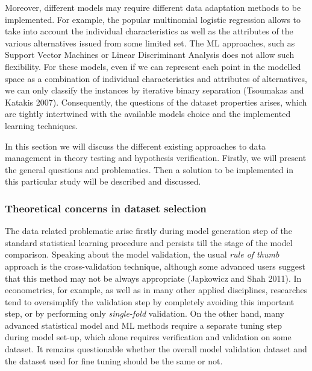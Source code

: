 \documentclass[12pt,]{article}
\begin{document}
Moreover, different models may require different data adaptation methods
to be implemented. For example, the popular multinomial logistic
regression allows to take into account the individual characteristics as
well as the attributes of the various alternatives issued from some
limited set. The ML approaches, such as Support Vector Machines or
Linear Discriminant Analysis does not allow such flexibility. For these
models, even if we can represent each point in the modelled space as a
combination of individual characteristics and attributes of
alternatives, we can only classify the instances by iterative binary
separation (Tsoumakas and Katakis 2007). Consequently, the questions of
the dataset properties arises, which are tightly intertwined with the
available models choice and the implemented learning techniques.

In this section we will discuss the different existing approaches to
data management in theory testing and hypothesis verification. Firstly,
we will present the general questions and problematics. Then a solution
to be implemented in this particular study will be described and
discussed.

\hypertarget{theoretical-concerns-in-dataset-selection}{%
\subsubsection{Theoretical concerns in dataset
selection}\label{theoretical-concerns-in-dataset-selection}}

The data related problematic arise firstly during model generation step
of the standard statistical learning procedure and persists till the
stage of the model comparison. Speaking about the model validation, the
usual \emph{rule of thumb} approach is the cross-validation technique,
although some advanced users suggest that this method may not be always
appropriate (Japkowicz and Shah 2011). In econometrics, for example, as
well as in many other applied disciplines, researches tend to
oversimplify the validation step by completely avoiding this important
step, or by performing only \emph{single-fold} validation. On the other
hand, many advanced statistical model and ML methods require a separate
tuning step during model set-up, which alone requires verification and
validation on some dataset. It remains questionable whether the overall
model validation dataset and the dataset used for fine tuning should be
the same or not.
\end{document}
